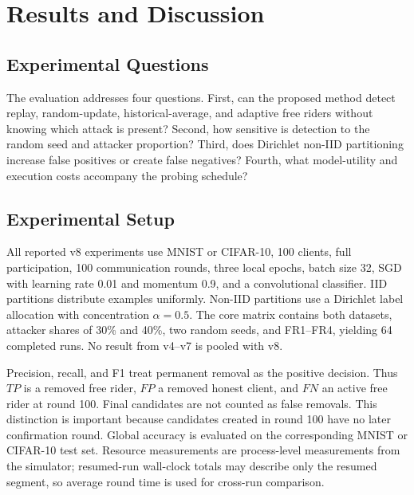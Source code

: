 \chapter{Results and Discussion}
\label{sec:results-discussion}

\section{Experimental Questions}

The evaluation addresses four questions. First, can the proposed method detect replay, random-update, historical-average, and adaptive free riders without knowing which attack is present? Second, how sensitive is detection to the random seed and attacker proportion? Third, does Dirichlet non-IID partitioning increase false positives or create false negatives? Fourth, what model-utility and execution costs accompany the probing schedule?

\section{Experimental Setup}

All reported v8 experiments use MNIST or CIFAR-10, 100 clients, full participation, 100 communication rounds, three local epochs, batch size 32, SGD with learning rate 0.01 and momentum 0.9, and a convolutional classifier. IID partitions distribute examples uniformly. Non-IID partitions use a Dirichlet label allocation with concentration $\alpha=0.5$. The core matrix contains both datasets, attacker shares of 30\% and 40\%, two random seeds, and FR1--FR4, yielding 64 completed runs. No result from v4--v7 is pooled with v8.

Precision, recall, and F1 treat permanent removal as the positive decision. Thus $TP$ is a removed free rider, $FP$ a removed honest client, and $FN$ an active free rider at round 100. Final candidates are not counted as false removals. This distinction is important because candidates created in round 100 have no later confirmation round. Global accuracy is evaluated on the corresponding MNIST or CIFAR-10 test set. Resource measurements are process-level measurements from the simulator; resumed-run wall-clock totals may describe only the resumed segment, so average round time is used for cross-run comparison.

